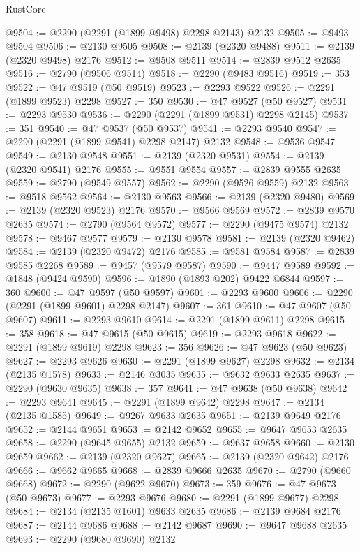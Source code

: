 \begin{lexlean}{RustCore}
\begin{coremodule}
@9504 := @2290 (@2291 (@1899 @9498) @2298 @2143) @2132
@9505 := @9493 @9504
@9506 := @2130 @9505
@9508 := @2139 (@2320 @9488)
@9511 := @2139 (@2320 @9498) @2176
@9512 := @9508 @9511
@9514 := @2839 @9512 @2635
@9516 := @2790 (@9506 @9514)
@9518 := @2290 (@9483 @9516)
@9519 := 353
@9522 := @47 @9519 (@50 @9519)
@9523 := @2293 @9522
@9526 := @2291 (@1899 @9523) @2298
@9527 := 350
@9530 := @47 @9527 (@50 @9527)
@9531 := @2293 @9530
@9536 := @2290 (@2291 (@1899 @9531) @2298 @2145)
@9537 := 351
@9540 := @47 @9537 (@50 @9537)
@9541 := @2293 @9540
@9547 := @2290 (@2291 (@1899 @9541) @2298 @2147) @2132
@9548 := @9536 @9547
@9549 := @2130 @9548
@9551 := @2139 (@2320 @9531)
@9554 := @2139 (@2320 @9541) @2176
@9555 := @9551 @9554
@9557 := @2839 @9555 @2635
@9559 := @2790 (@9549 @9557)
@9562 := @2290 (@9526 @9559) @2132
@9563 := @9518 @9562
@9564 := @2130 @9563
@9566 := @2139 (@2320 @9480)
@9569 := @2139 (@2320 @9523) @2176
@9570 := @9566 @9569
@9572 := @2839 @9570 @2635
@9574 := @2790 (@9564 @9572)
@9577 := @2290 (@9475 @9574) @2132
@9578 := @9467 @9577
@9579 := @2130 @9578
@9581 := @2139 (@2320 @9462)
@9584 := @2139 (@2320 @9472) @2176
@9585 := @9581 @9584
@9587 := @2839 @9585 @2268
@9589 := @9457 (@9579 @9587)
@9590 := @9447 @9589
@9592 := @1848 (@9424 @9590)
@9596 := @1890 (@1893 @202) @9422 @6844
@9597 := 360
@9600 := @47 @9597 (@50 @9597)
@9601 := @2293 @9600
@9606 := @2290 (@2291 (@1899 @9601) @2298 @2147)
@9607 := 361
@9610 := @47 @9607 (@50 @9607)
@9611 := @2293 @9610
@9614 := @2291 (@1899 @9611) @2298
@9615 := 358
@9618 := @47 @9615 (@50 @9615)
@9619 := @2293 @9618
@9622 := @2291 (@1899 @9619) @2298
@9623 := 356
@9626 := @47 @9623 (@50 @9623)
@9627 := @2293 @9626
@9630 := @2291 (@1899 @9627) @2298
@9632 := @2134 (@2135 @1578)
@9633 := @2146 @3035
@9635 := @9632 @9633 @2635
@9637 := @2290 (@9630 @9635)
@9638 := 357
@9641 := @47 @9638 (@50 @9638)
@9642 := @2293 @9641
@9645 := @2291 (@1899 @9642) @2298
@9647 := @2134 (@2135 @1585)
@9649 := @9267 @9633 @2635
@9651 := @2139 @9649 @2176
@9652 := @2144 @9651
@9653 := @2142 @9652
@9655 := @9647 @9653 @2635
@9658 := @2290 (@9645 @9655) @2132
@9659 := @9637 @9658
@9660 := @2130 @9659
@9662 := @2139 (@2320 @9627)
@9665 := @2139 (@2320 @9642) @2176
@9666 := @9662 @9665
@9668 := @2839 @9666 @2635
@9670 := @2790 (@9660 @9668)
@9672 := @2290 (@9622 @9670)
@9673 := 359
@9676 := @47 @9673 (@50 @9673)
@9677 := @2293 @9676
@9680 := @2291 (@1899 @9677) @2298
@9684 := @2134 (@2135 @1601) @9633 @2635
@9686 := @2139 @9684 @2176
@9687 := @2144 @9686
@9688 := @2142 @9687
@9690 := @9647 @9688 @2635
@9693 := @2290 (@9680 @9690) @2132

\end{coremodule}
\end{lexlean}
